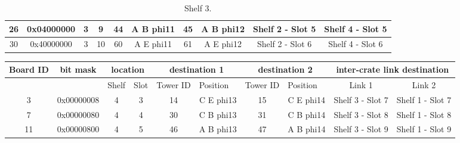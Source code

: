 \documentclass[11pt,letterpaper]{article}
\begin{document}
\begin{table}[h]
\begin{tabular}{|c|c|c|c|c|c|c|c|c|c|}
26                     & 0x04000000            & 3                          & 9                         & 44                            & A B phi11                     & 45                            & A B phi12                     & Shelf 2 - Slot 5        & Shelf 4 - Slot 5        \\ \hline
30                     & 0x40000000            & 3                          & 10                        & 60                            & A E phi11                     & 61                            & A E phi12                     & Shelf 2 - Slot 6        & Shelf 4 - Slot 6        \\ \hline
\end{tabular}
\caption{Shelf 3.}
\label{tab:shelf3}
\end{table}

\begin{table}[h]
\tiny
\begin{tabular}{|c|c|c|c|c|c|c|c|c|c|}
\hline
Board ID               & bit mask              & \multicolumn{2}{c|}{location}                          & \multicolumn{2}{c|}{destination 1}                            & \multicolumn{2}{c|}{destination 2}                            & \multicolumn{2}{c|}{inter-crate link destination} \\ \hline
\multicolumn{1}{|l|}{} & \multicolumn{1}{l|}{} & \multicolumn{1}{l|}{Shelf} & \multicolumn{1}{l|}{Slot} & \multicolumn{1}{l|}{Tower ID} & \multicolumn{1}{l|}{Position} & \multicolumn{1}{l|}{Tower ID} & \multicolumn{1}{l|}{Position} & Link 1                  & Link 2                  \\ \hline
3                      & 0x00000008            & 4                          & 3                         & 14                            & C E phi13                     & 15                            & C E phi14                     & Shelf 3 - Slot 7        & Shelf 1 - Slot 7        \\ \hline
7                      & 0x00000080            & 4                          & 4                         & 30                            & C B phi13                     & 31                            & C B phi14                     & Shelf 3 - Slot 8        & Shelf 1 - Slot 8        \\ \hline
11                     & 0x00000800            & 4                          & 5                         & 46                            & A B phi13                     & 47                            & A B phi14                     & Shelf 3 - Slot 9        & Shelf 1 - Slot 9        \\ \hline

\end{tabular}
\end{table}
\end{document}
